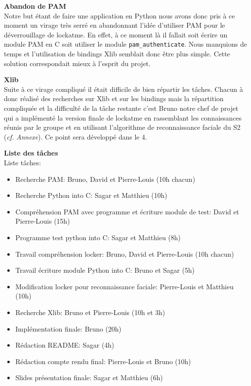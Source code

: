 \documentclass[french]{report}
\begin{document}
  \vspace{0.5cm}

  \textbf{Abandon de PAM}\\

  Notre but étant de faire une application en Python nous avons donc pris à ce
  moment un virage très serré en abandonnant l’idée d’utiliser PAM pour le
  déverrouillage de lockatme. En effet, à ce moment là il fallait soit écrire un
  module PAM en C soit utiliser le module \texttt{pam\_authenticate}. Nous
  manquions de temps et l’utilisation de bindings Xlib semblait donc être plus
  simple. Cette solution correspondait mieux à l’esprit du
  projet.

  \vspace{0.5cm}

  \textbf{Xlib}\\

  Suite à ce virage compliqué il était difficile de bien répartir les tâches.
  Chacun à donc réalisé des recherches sur Xlib et sur les bindings mais la
  répartition compliquée et la difficulté de la tâche restante c’est
  Bruno notre chef de projet qui a implémenté la version finale de lockatme en
  rassemblant les connaissances réunis par le groupe et en utilisant
  l’algorithme de reconnaissance faciale du S2 (\emph{cf. Annexe}).
  Ce point sera développé dans le 4.

  \vspace{0.5cm}

\textbf{Liste des tâches}\\

Liste tâches:
  \begin{itemize}[label=\textbullet, font=\normalfont \color{blue}]
  \item{Recherche PAM: Bruno, David et Pierre-Louis (10h chacun)}
  \item{Recherche Python into C: Sagar et Matthieu (10h)}
  \item{Compréhension PAM avec programme et écriture module de test: David et
  Pierre-Louis (15h)}
  \item{Programme test python into C: Sagar et Matthieu (8h)}
  \item{Travail compréhension locker: Bruno, David et Pierre-Louis (10h chacun)}
  \item{Travail écriture module Python into C: Bruno et Sagar (5h)}
  \item{Modification locker pour reconnaissance faciale: Pierre-Louis et Matthieu (10h)}
  \item{Recherche Xlib: Bruno et Pierre-Louis (10h et 3h)}
  \item{Implémentation finale: Bruno (20h)}
  \item{Rédaction README: Sagar (4h)}
  \item{Rédaction compte rendu final: Pierre-Louis et Bruno (10h)}
  \item{Slides présentation finale: Sagar et Matthieu (6h)}
\end{itemize}
\end{document}
